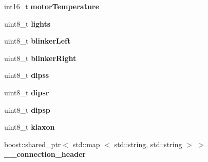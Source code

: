 \begin{DoxyCompactItemize}
\item 
\hypertarget{struct_c_i_t_i_u_s___control___communication_1_1msg__vehicle_info___a1277e38dc1499329cbe6bcbc6e5fc198}{int16\-\_\-t {\bfseries motor\-Temperature}}\label{struct_c_i_t_i_u_s___control___communication_1_1msg__vehicle_info___a1277e38dc1499329cbe6bcbc6e5fc198}

\item 
\hypertarget{struct_c_i_t_i_u_s___control___communication_1_1msg__vehicle_info___a96e2ba8aef44c4e1039dd80d96623c60}{uint8\-\_\-t {\bfseries lights}}\label{struct_c_i_t_i_u_s___control___communication_1_1msg__vehicle_info___a96e2ba8aef44c4e1039dd80d96623c60}

\item 
\hypertarget{struct_c_i_t_i_u_s___control___communication_1_1msg__vehicle_info___ac80c448ee602e64a2fc0f3a85d995e4c}{uint8\-\_\-t {\bfseries blinker\-Left}}\label{struct_c_i_t_i_u_s___control___communication_1_1msg__vehicle_info___ac80c448ee602e64a2fc0f3a85d995e4c}

\item 
\hypertarget{struct_c_i_t_i_u_s___control___communication_1_1msg__vehicle_info___a926b2a4c2124f09100350db7e8b22d03}{uint8\-\_\-t {\bfseries blinker\-Right}}\label{struct_c_i_t_i_u_s___control___communication_1_1msg__vehicle_info___a926b2a4c2124f09100350db7e8b22d03}

\item 
\hypertarget{struct_c_i_t_i_u_s___control___communication_1_1msg__vehicle_info___a89bfb7e8f93714066220ed5b702dee75}{uint8\-\_\-t {\bfseries dipss}}\label{struct_c_i_t_i_u_s___control___communication_1_1msg__vehicle_info___a89bfb7e8f93714066220ed5b702dee75}

\item 
\hypertarget{struct_c_i_t_i_u_s___control___communication_1_1msg__vehicle_info___ae6f57d4f6e3038aa28365a7879cf59e1}{uint8\-\_\-t {\bfseries dipsr}}\label{struct_c_i_t_i_u_s___control___communication_1_1msg__vehicle_info___ae6f57d4f6e3038aa28365a7879cf59e1}

\item 
\hypertarget{struct_c_i_t_i_u_s___control___communication_1_1msg__vehicle_info___a12a1b1b837d71acfe3adb846cbe55f2b}{uint8\-\_\-t {\bfseries dipsp}}\label{struct_c_i_t_i_u_s___control___communication_1_1msg__vehicle_info___a12a1b1b837d71acfe3adb846cbe55f2b}

\item 
\hypertarget{struct_c_i_t_i_u_s___control___communication_1_1msg__vehicle_info___a37d07a0357e37d7a5223789c2a07c20e}{uint8\-\_\-t {\bfseries klaxon}}\label{struct_c_i_t_i_u_s___control___communication_1_1msg__vehicle_info___a37d07a0357e37d7a5223789c2a07c20e}

\item 
\hypertarget{struct_c_i_t_i_u_s___control___communication_1_1msg__vehicle_info___a571c4d0a7a7f1757dcef4717e99e608b}{boost\-::shared\-\_\-ptr$<$ std\-::map\*
$<$ std\-::string, std\-::string $>$ $>$ {\bfseries \-\_\-\-\_\-connection\-\_\-header}}\label{struct_c_i_t_i_u_s___control___communication_1_1msg__vehicle_info___a571c4d0a7a7f1757dcef4717e99e608b}

\end{DoxyCompactItemize}
